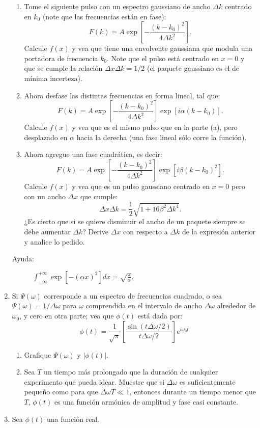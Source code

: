 \documentclass[11pt,spanish,a4paper]{article}
\begin{document}
\begin{enumerate}
\begin{enumerate}
\item Tome el siguiente pulso con un espectro gaussiano de ancho $\Delta k$
centrado en $k_{0}$ (note que las frecuencias están en fase):
\[
F(k)=A\exp\left[-\frac{(k-k_{0})^{2}}{4\Delta k^{2}}\right].
\]
Calcule $f(x)$ y vea que tiene una envolvente gaussiana que modula
una portadora de frecuencia $k_{0}$. Note que el pulso está centrado
en $x=0$ y que se cumple la relación $\Delta x\Delta k=1/2$ (el
paquete gaussiano es el de mínima incerteza).
\item Ahora desfase las distintas frecuencias en forma lineal, tal que:
\[
F(k)=A\exp\left[-\frac{(k-k_{0})^{2}}{4\Delta k^{2}}\right]\exp\left[i\alpha(k-k_{0})\right].
\]
Calcule $f(x)$ y vea que es el mismo pulso que en la parte (a), pero
desplazado en $\alpha$ hacia la derecha (una fase lineal sólo corre
la función).
\item Ahora agregue una fase cuadrática, es decir:
\[
F(k)=A\exp\left[-\frac{(k-k_{0})^{2}}{4\Delta k^{2}}\right]\exp\left[i\beta(k-k_{0})^{2}\right].
\]
Calcule $f(x)$ y vea que es un pulso gaussiano centrado en $x=0$
pero con un ancho $\Delta x$ que cumple:
\[
\Delta x\Delta k=\frac{1}{2}\sqrt{1+16\beta^{2}\Delta k^{4}}.
\]
¿Es cierto que si se quiere disminuir el ancho de un paquete siempre
se debe aumentar $\Delta k$? Derive $\Delta x$ con respecto a $\Delta k$
de la expresión anterior y analice lo pedido.\end{enumerate}
\begin{description}
\item [{Ayuda:}] $\int_{-\infty}^{+\infty}\exp\left[-(\alpha x)^{2}\right]dx=\sqrt{\frac{\pi}{\alpha}}$.
\end{description}
\item Si $\Psi(\omega)$ corresponde a un espectro de frecuencias cuadrado,
o sea $\Psi(\omega)=1/\Delta\omega$ para $\omega$ comprendida en
el intervalo de ancho $\Delta\omega$ alrededor de $\omega_{0}$,
y cero en otra parte; vea que $\phi(t)$ está dada por:
\[
\phi(t)=\frac{1}{\sqrt{\pi}}\left[\frac{\sin(t\Delta\omega/2)}{t\Delta\omega/2}\right]e^{i\omega_{0}t}
\]



\begin{enumerate}
\item Grafique $\Psi(\omega)$ y $\left|\phi(t)\right|$.
\item Sea $T$ un tiempo más prolongado que la duración de cualquier experimento
que pueda idear. Muestre que si $\Delta\omega$ es suficientemente
pequeño como para que $\Delta\omega T\ll1$, entonces durante un tiempo
menor que $T$, $\phi(t)$ es una función armónica de amplitud y fase
casi constante.
\end{enumerate}
\item Sea $\phi(t)$ una función real.




\end{enumerate}
\end{document}
